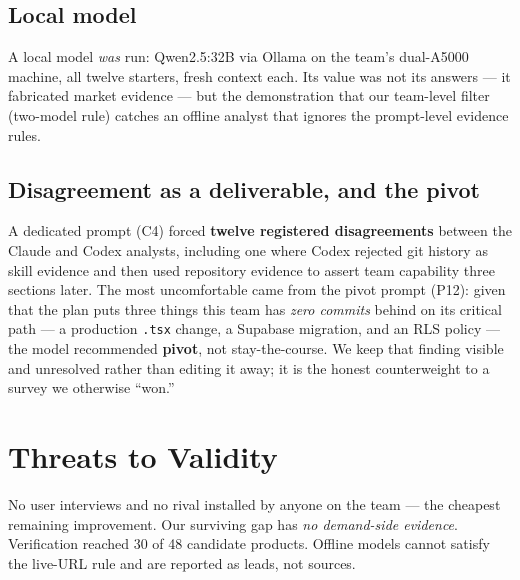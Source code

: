 \documentclass[sigconf,nonacm]{acmart}
\begin{document}
\subsection{Local model}
A local model \emph{was} run: Qwen2.5:32B via Ollama on the team's dual-A5000
machine, all twelve starters, fresh context each. Its value was not its answers ---
it fabricated market evidence --- but the demonstration that our team-level filter
(two-model rule) catches an offline analyst that ignores the prompt-level evidence
rules.

\subsection{Disagreement as a deliverable, and the pivot}
A dedicated prompt (C4) forced \textbf{twelve registered disagreements} between the
Claude and Codex analysts, including one where Codex rejected git history as skill
evidence and then used repository evidence to assert team capability three sections
later. The most uncomfortable came from the pivot prompt (P12): given that the plan
puts three things this team has \emph{zero commits} behind on its critical path ---
a production \texttt{.tsx} change, a Supabase migration, and an RLS policy --- the
model recommended \textbf{pivot}, not stay-the-course. We keep that finding visible
and unresolved rather than editing it away; it is the honest counterweight to a
survey we otherwise ``won.''

\section{Threats to Validity}
No user interviews and no rival installed by anyone on the team --- the cheapest
remaining improvement. Our surviving gap has \emph{no demand-side evidence}.
Verification reached 30 of 48 candidate products. Offline models cannot satisfy the
live-URL rule and are reported as leads, not sources.

\balance


\end{document}
